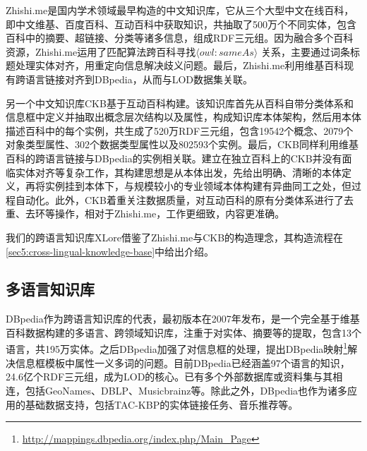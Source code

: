Zhishi.me\cite{niu2011zhishi,wang2014publishing}是国内学术领域最早构造的中文知识库，它从三个大型中文在线百科，即中文维基、百度百科、互动百科中获取知识，共抽取了500万个不同实体，包含百科中的摘要、超链接、分类等诸多信息，组成RDF三元组。因为融合多个百科资源，Zhishi.me运用了匹配算法跨百科寻找$\langle owl:sameAs\rangle$ 关系，主要通过词条标题处理实体对齐，用重定向信息解决歧义问题。最后，Zhishi.me利用维基百科现有跨语言链接对齐到DBpedia，从而与LOD数据集关联。

另一个中文知识库CKB\cite{wang2011building}基于互动百科构建。该知识库首先从百科自带分类体系和信息框中定义并抽取出概念层次结构以及属性，构成知识库本体架构，然后用本体描述百科中的每个实例，共生成了520万RDF三元组，包含19542个概念、2079个对象类型属性、302个数据类型属性以及802593个实例。最后，CKB同样利用维基百科的跨语言链接与DBpedia的实例相关联。建立在独立百科上的CKB并没有面临实体对齐等复杂工作，其构建思想是从本体出发，先给出明确、清晰的本体定义，再将实例挂到本体下，与规模较小的专业领域本体构建有异曲同工之处，但过程自动化。此外，CKB着重关注数据质量，对互动百科的原有分类体系进行了去重、去环等操作，相对于Zhishi.me，工作更细致，内容更准确。

我们的跨语言知识库XLore借鉴了Zhishi.me与CKB的构造理念，其构造流程在\ref{sec5:cross-lingual-knowledge-base}中给出介绍。

\subsection{多语言知识库}
DBpedia作为跨语言知识库的代表，最初版本在2007年发布\cite{auer2007dbpedia}，是一个完全基于维基百科数据构建的多语言、跨领域知识库，注重于对实体、摘要等的提取，包含13个语言，共195万实体。之后DBpedia加强了对信息框的处理，提出DBpedia映射\footnote{\url{http://mappings.dbpedia.org/index.php/Main_Page}}解决信息框模板中属性一义多词的问题。目前DBpedia已经涵盖97个语言的知识，24.6亿个RDF三元组，成为LOD的核心。已有多个外部数据库或资料集与其相连，包括GeoNames、DBLP、Musicbrainz等。除此之外，DBpedia也作为诸多应用的基础数据支持，包括TAC-KBP\cite{mendes2011evaluating}的实体链接任务、音乐推荐\cite{passant2010dbrec}等。


